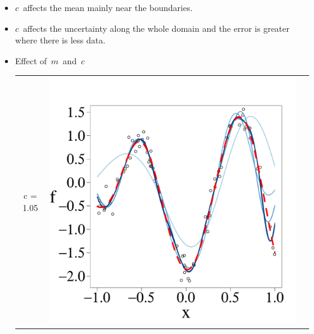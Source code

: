 \documentclass[8pt]{beamer} %
\begin{document}
\begin{frame}
\begin{itemize}
\vspace{2mm}
\begin{itemize}\setlength\itemsep{2mm}
\normalsize
\item<1-> $c$\, affects the mean mainly near the boundaries.
\item<2-> $c$\, affects the uncertainty along the whole domain and the error is greater where there is less data. 
\end{itemize}
\end{itemize}
\end{frame}

\begin{frame}
 
\begin{itemize}\setlength\itemsep{2mm}
\item \normalsize Effect of\, $m$\, and\, $c$\\[3mm]
\begin{adjustwidth}{-4.3em}{-3em}
%
\centering
\begin{tabular}{ c c c }
\arrayrulecolor{darkgray}\hline
c = 1.05 &
\includegraphics[scale=0.17, trim = 0mm 14mm 0mm 14mm, clip]{ch5_fig3_Post_part1.pdf}

\end{tabular}
\end{adjustwidth}
\end{itemize}
\end{frame}
\end{document}
